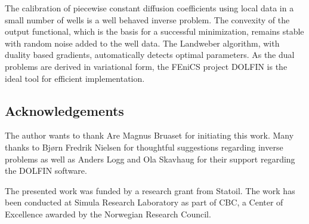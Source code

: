 The calibration of piecewise constant diffusion coefficients using
local data in a small number of wells is a well behaved inverse
problem.  The convexity of the output functional, which is the basis
for a successful minimization, remains stable with random noise added
to the well data.  The Landweber algorithm, with duality based
gradients, automatically detects optimal parameters.  As the dual
problems are derived in variational form, the FEniCS project DOLFIN is
the ideal tool for efficient implementation.

\subsection*{Acknowledgements}

The author wants to thank Are Magnus Bruaset for initiating this work.
Many thanks to Bj{\o}rn Fredrik Nielsen for thoughtful suggestions
regarding inverse problems as well as Anders Logg and Ola Skavhaug for
their support regarding the DOLFIN software.

The presented work was funded by a research grant from Statoil.  The
work has been conducted at Simula Research Laboratory as part of CBC,
a Center of Excellence awarded by the Norwegian Research Council.



